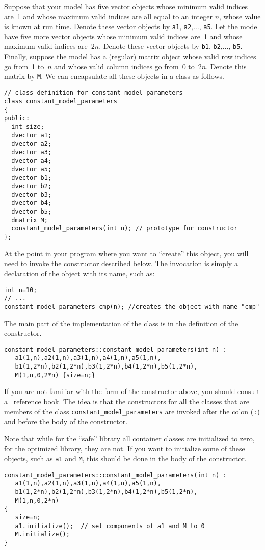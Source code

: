 \documentclass{admbmanual}
\begin{document}
Suppose that your model has five vector objects whose minimum valid indices
are~1 and whose maximum valid indices are all equal to an integer $n$, whose
value is known at run time. Denote these vector objects by \texttt{a1},
\texttt{a2},$\ldots$, \texttt{a5}. Let the model have five more vector objects
whose minimum valid indices are~1 and whose maximum valid indices are~$2n$.
Denote these vector objects by \texttt{b1}, \texttt{b2},$\ldots$, \texttt{b5}.
Finally, suppose the model has a (regular) matrix object whose valid row indices
go from~1 to~$n$ and whose valid column indices go from~0 to~$2n$. Denote this
matrix by \texttt{M}. We can encapsulate all these objects in a class as
follows.
\begin{lstlisting}
// class definition for constant_model_parameters
class constant_model_parameters
{
public:
  int size;
  dvector a1;
  dvector a2;
  dvector a3;
  dvector a4;
  dvector a5;
  dvector b1;
  dvector b2;
  dvector b3;
  dvector b4;
  dvector b5;
  dmatrix M;
  constant_model_parameters(int n); // prototype for constructor
};
\end{lstlisting}

At the point in your program where you want to ``create'' this object, you will
need to invoke the constructor described below. The invocation is simply a
declaration of the object with its name, such as:
\begin{lstlisting}
int n=10;
// ...
constant_model_parameters cmp(n); //creates the object with name "cmp"
\end{lstlisting}

The main part of the implementation of the class is in the definition of the
constructor.
\begin{lstlisting}
constant_model_parameters::constant_model_parameters(int n) :
   a1(1,n),a2(1,n),a3(1,n),a4(1,n),a5(1,n),
   b1(1,2*n),b2(1,2*n),b3(1,2*n),b4(1,2*n),b5(1,2*n),
   M(1,n,0,2*n) {size=n;}
\end{lstlisting}
If you are not familiar with the form of the constructor above, you should
consult a \cplus\ reference book. The idea is that the constructors for all the
classes that are members of the class \texttt{constant\_model\_parameters} are
invoked after the colon (\texttt{:}) and before the body of the constructor.

Note that while for the ``safe'' library all container classes are initialized
to zero, for the optimized library, they are not. If you want to initialize some
of these objects, such as \texttt{a1} and \texttt{M}, this should be done in the
body of the constructor.
\begin{lstlisting}
constant_model_parameters::constant_model_parameters(int n) :
   a1(1,n),a2(1,n),a3(1,n),a4(1,n),a5(1,n),
   b1(1,2*n),b2(1,2*n),b3(1,2*n),b4(1,2*n),b5(1,2*n),
   M(1,n,0,2*n)
{
   size=n;
   a1.initialize();  // set components of a1 and M to 0
   M.initialize();
}
\end{lstlisting}
\end{document}
